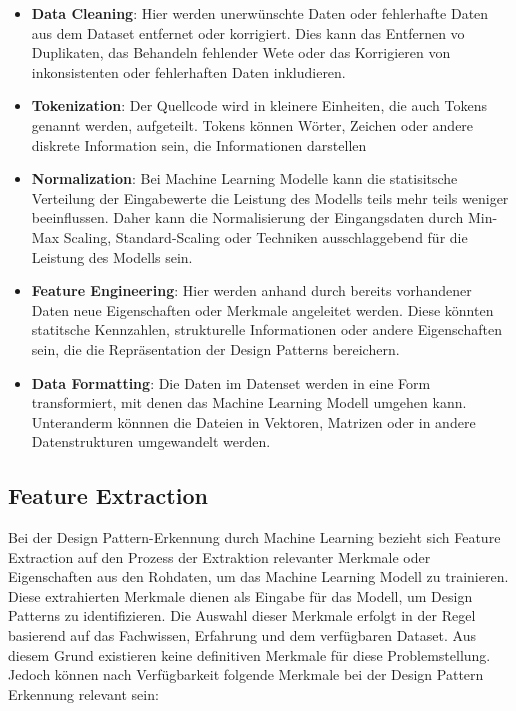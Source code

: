 \documentclass[conference]{IEEEtran}
\begin{document}
\begin{itemize}
    \item \textbf{Data Cleaning}: Hier werden unerwünschte Daten oder fehlerhafte Daten aus dem Dataset entfernet oder korrigiert. Dies kann das Entfernen vo Duplikaten, das Behandeln fehlender Wete oder das Korrigieren von inkonsistenten oder fehlerhaften Daten inkludieren.
    \item \textbf{Tokenization}: Der Quellcode wird in kleinere Einheiten, die auch Tokens genannt werden, aufgeteilt. Tokens können Wörter, Zeichen oder andere diskrete Information sein, die Informationen darstellen
    \item \textbf{Normalization}: Bei Machine Learning Modelle kann die statisitsche Verteilung der Eingabewerte die Leistung des Modells teils mehr teils weniger beeinflussen. Daher kann die Normalisierung der Eingangsdaten durch Min-Max Scaling, Standard-Scaling oder Techniken ausschlaggebend für die Leistung des Modells sein.
    \item \textbf{Feature Engineering}: Hier werden anhand durch bereits vorhandener Daten neue Eigenschaften oder Merkmale angeleitet werden. Diese könnten statitsche Kennzahlen, strukturelle Informationen oder andere Eigenschaften sein, die die Repräsentation der Design Patterns bereichern.
    \item \textbf{Data Formatting}: Die Daten im Datenset werden in eine Form transformiert, mit denen das Machine Learning Modell umgehen kann. Unteranderm könnnen die Dateien in Vektoren, Matrizen oder in andere Datenstrukturen umgewandelt werden.
\end{itemize}



\subsection{Feature Extraction}

Bei der Design Pattern-Erkennung durch Machine Learning bezieht sich Feature Extraction auf den Prozess der Extraktion relevanter Merkmale oder Eigenschaften aus den Rohdaten, um das Machine Learning Modell zu trainieren.
Diese extrahierten Merkmale dienen als Eingabe für das Modell, um Design Patterns zu identifizieren. Die Auswahl dieser Merkmale erfolgt in der Regel basierend auf das Fachwissen, Erfahrung und dem verfügbaren Dataset.
Aus diesem Grund existieren keine definitiven Merkmale für diese Problemstellung. Jedoch können nach Verfügbarkeit folgende Merkmale bei der Design Pattern Erkennung relevant sein:
\end{document}

